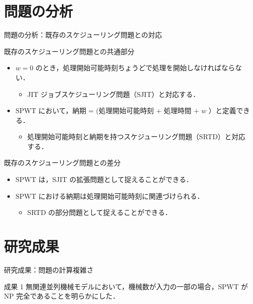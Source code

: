 \documentclass[dvipdfmx]{beamer}
\begin{document}
\section{問題の分析}
\begin{frame}{問題の分析：既存のスケジューリング問題との対応}
  \begin{block}{既存のスケジューリング問題との共通部分}
    \begin{itemize}
      \item {$w = 0$ のとき，処理開始可能時刻ちょうどで処理を開始しなければならない．}
      \begin{itemize}
        \item {\alert{JIT ジョブスケジューリング問題（SJIT）}と対応する．}
      \end{itemize}
      \item {SPWT において，納期 = (処理開始可能時刻 + 処理時間 + $w$ ）と定義できる．}
      \begin{itemize}
        \item {\alert{処理開始可能時刻と納期を持つスケジューリング問題（SRTD）}と対応する．}
      \end{itemize}
    \end{itemize}
  \end{block}
  \begin{block}{既存のスケジューリング問題との差分}
    \begin{itemize}
      \item {SPWT は，SJIT の\alert{拡張問題}として捉えることができる．}
      \item {SPWT における納期は処理開始可能時刻に関連づけられる．}
      \begin{itemize}
        \item {SRTD の\alert{部分問題}として捉えることができる．}
      \end{itemize}
    \end{itemize}
  \end{block}
\end{frame}
\section{研究成果}
\begin{frame}{研究成果：問題の計算複雑さ}
  \begin{alertblock}{成果 1}
    無関連並列機械モデルにおいて，機械数が入力の一部の場合，SPWT が NP 完全であることを明らかにした．
  \end{alertblock}
\end{frame}
\end{document}
